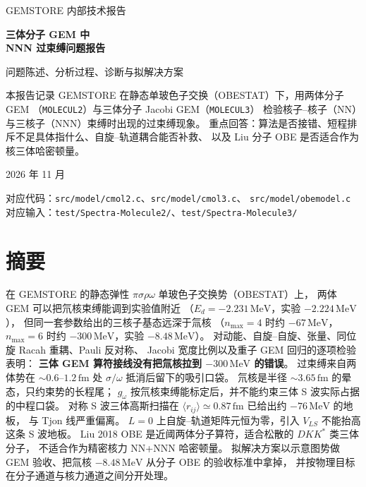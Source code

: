 \documentclass[12pt,a4paper]{article}
\newcommand{\MeV}{\,\mathrm{MeV}}
\newcommand{\fm}{\,\mathrm{fm}}
\begin{document}
\begin{titlepage}
\centering
{\large GEMSTORE 内部技术报告 \par}
\vspace{1.6em}
{\Huge\bfseries 三体分子 GEM 中\\[0.35em] NNN 过束缚问题报告\par}
\vspace{1.2em}
{\large 问题陈述、分析过程、诊断与拟解决方案\par}
\vspace{2.0em}
\begin{minipage}{0.88\textwidth}
\raggedright
本报告记录 GEMSTORE 在静态单玻色子交换（OBESTAT）下，用两体分子 GEM
（\texttt{MOLECUL2}）与三体分子 Jacobi GEM（\texttt{MOLECUL3}）
检验核子--核子（NN）与三核子（NNN）束缚时出现的过束缚现象。
重点回答：算法是否接错、短程排斥不足具体指什么、自旋--轨道耦合能否补救、
以及 Liu 分子 OBE 是否适合作为核三体哈密顿量。
\end{minipage}
\vspace{2.4em}
{\large 2026 年 11 月\par}
\vfill
{\small 对应代码：\texttt{src/model/cmol2.c}、\texttt{src/model/cmol3.c}、
\texttt{src/model/obemodel.c}\\
对应输入：\texttt{test/Spectra-Molecule2/}、\texttt{test/Spectra-Molecule3/}\par}
\end{titlepage}

\tableofcontents
\newpage

\section{摘要}

在 GEMSTORE 的静态弹性 $\pi\sigma\rho\omega$ 单玻色子交换势（OBESTAT）上，
两体 GEM 可以把氘核束缚能调到实验值附近
（$E_d=-2.231\MeV$，实验 $-2.224\MeV$），
但同一套参数给出的三核子基态远深于氚核
（$n_{\max}=4$ 时约 $-67\MeV$，$n_{\max}=6$ 时约 $-300\MeV$，实验 $-8.48\MeV$）。
对动能、自旋--自旋、张量、同位旋 Racah 重耦、Pauli 反对称、
Jacobi 宽度比例以及重子 GEM 回归的逐项检验表明：
\textbf{三体 GEM 算符接线没有把氚核拉到 $-300\MeV$ 的错误}。
过束缚来自两体势在 $\sim 0.6$--$1.2\fm$ 处 $\sigma/\omega$ 抵消后留下的吸引口袋。
氘核是半径 $\sim 3.65\fm$ 的晕态，只约束势的长程尾；
$g_\omega$ 按氘核束缚能标定后，并不能约束三体 S 波实际占据的中程口袋。
对称 S 波三体高斯扫描在 $\langle r_{ij}\rangle\simeq 0.87\fm$ 已给出约 $-76\MeV$ 的地板，
与 Tjon 线严重偏离。
$L=0$ 上自旋--轨道矩阵元恒为零，引入 $V_{LS}$ 不能抬高这条 S 波地板。
Liu 2018 OBE 是近阈两体分子算符，适合松散的 $DKK^*$ 类三体分子，
不适合作为精密核力 NN+NNN 哈密顿量。
拟解决方案以示意图势做 GEM 验收、把氚核 $-8.48\MeV$ 从分子 OBE 的验收标准中拿掉，
并按物理目标在分子通道与核力通道之间分开处理。
\end{document}
